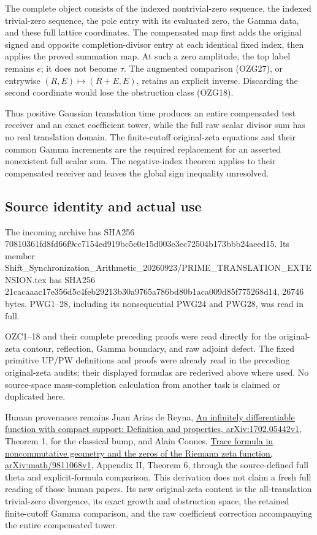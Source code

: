 \documentclass[
  10pt,
  a4paper,
]{article}
\begin{document}
The complete object consists of the indexed nontrivial-zero sequence,
the indexed trivial-zero sequence, the pole entry with its evaluated
zero, the Gamma data, and these full lattice coordinates. The
compensated map first adds the original signed and opposite
completion-divisor entry at each identical fixed index, then applies the
proved summation map. At such a zero amplitude, the top label remains
\(e\); it does not become \(\tau\). The augmented comparison (OZG27), or
entrywise \((R,E)\mapsto(R+E,E)\), retains an explicit inverse.
Discarding the second coordinate would lose the obstruction class
(OZG18).

Thus positive Gaussian translation time produces an entire compensated
test receiver and an exact coefficient tower, while the full raw scalar
divisor sum has no real translation domain. The finite-cutoff
original-zeta equations and their common Gamma increments are the
required replacement for an asserted nonexistent full scalar sum. The
negative-index theorem applies to their compensated receiver and leaves
the global sign inequality unresolved.

\subsection{Source identity and actual
use}\label{source-identity-and-actual-use}

The incoming archive has SHA256
70810361fd8fd66f9cc7154ed919bc5c0c15d003e3ec72504b173bbb24aeed15. Its
member
Shift\_Synchronization\_Arithmetic\_20260923/PRIME\_TRANSLATION\_EXTENSION.tex
has SHA256
21cacaaac17e356d5c4feb29213b30a9765a786bd80b1aca009d85f775268d14, 26746
bytes. PWG1--28, including its nonsequential PWG24 and PWG28, was read
in full.

OZC1--18 and their complete preceding proofs were read directly for the
original-zeta contour, reflection, Gamma boundary, and raw adjoint
defect. The fixed primitive UP/PW definitions and proofs were already
read in the preceding original-zeta audits; their displayed formulas are
rederived above where used. No source-space mass-completion calculation
from another task is claimed or duplicated here.

Human provenance remains Juan Arias de Reyna,
\href{https://arxiv.org/abs/1702.05442v1}{An infinitely differentiable
function with compact support: Definition and properties,
arXiv:1702.05442v1}, Theorem 1, for the classical bump, and Alain
Connes, \href{https://arxiv.org/abs/math/9811068}{Trace formula in
noncommutative geometry and the zeros of the Riemann zeta function,
arXiv:math/9811068v1}, Appendix II, Theorem 6, through the
source-defined full theta and explicit-formula comparison. This
derivation does not claim a fresh full reading of those human papers.
Its new original-zeta content is the all-translation trivial-zero
divergence, its exact growth and obstruction space, the retained
finite-cutoff Gamma comparison, and the raw coefficient correction
accompanying the entire compensated tower.
\end{document}
